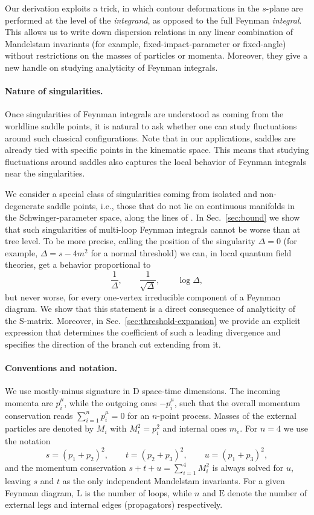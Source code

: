 \documentclass[12pt]{article}
\numberwithin{figure}{section}
\def \be {\begin{equation}}
\def \ee {\end{equation}}
\def \D {\mathrm{D}}
\def \E {\mathrm{E}}
\def \L {\mathrm{L}}
\begin{document}
	Our derivation exploits a trick, in which contour deformations in the $s$-plane are performed at the level of the \emph{integrand}, as opposed to the full Feynman \emph{integral}. This allows us to write down dispersion relations in any linear combination of Mandelstam invariants (for example, fixed-impact-parameter or fixed-angle) without restrictions on the masses of particles or momenta. Moreover, they give a new handle on studying analyticity of Feynman integrals.
	
	\paragraph{Nature of singularities.}
	Once singularities of Feynman integrals are understood as coming from the worldline saddle points, it is natural to ask whether one can study fluctuations around such classical configurations. Note that in our applications, saddles are already tied with specific points in the kinematic space. This means that studying fluctuations around saddles also captures the local behavior of Feynman integrals near the singularities. 
	
	We consider a special class of singularities coming from isolated and non-degenerate saddle points, i.e., those that do not lie on continuous manifolds in the Schwinger-parameter space, along the lines of \cite{Landau:1959fi}. In Sec.~\ref{sec:bound} we show that such singularities of multi-loop Feynman integrals cannot be worse than at tree level. To be more precise, calling the position of the singularity $\Delta = 0$ (for example, $\Delta = s - 4m^2$ for a normal threshold) we can, in local quantum field theories, get a behavior proportional to
	\be
	\frac{1}{\Delta}, \qquad \frac{1}{\sqrt{\Delta}}, \qquad \log \Delta,
	\ee
	but never worse, for every one-vertex irreducible component of a Feynman diagram. We show that this statement is a direct consequence of analyticity of the S-matrix. Moreover, in Sec.~\ref{sec:threshold-expansion} we provide an explicit expression that determines the coefficient of such a leading divergence and specifies the direction of the branch cut extending from it.
	
	\paragraph{Conventions and notation.} We use mostly-minus signature in $\D$ space-time dimensions. The incoming momenta are $p_i^\mu$, while the outgoing ones $-p_i^\mu$, such that the overall momentum conservation reads $\sum_{i=1}^{n} p_i^\mu = 0$ for an $n$-point process. Masses of the external particles are denoted by $M_i$ with $M_i^2 = p_i^2$ and internal ones $m_e$. For $n=4$ we use the notation
	\be
	s = (p_1 + p_2)^2, \qquad t = (p_2 + p_3)^2, \qquad u = (p_1 + p_3)^2,
	\ee
	and the momentum conservation $s+t+u=\sum_{i=1}^{4} M_i^2$ is always solved for $u$, leaving $s$ and $t$ as the only independent Mandelstam invariants. For a given Feynman diagram, $\L$ is the number of loops, while $n$ and $\E$ denote the number of external legs and internal edges (propagators) respectively.
	
\end{document}
